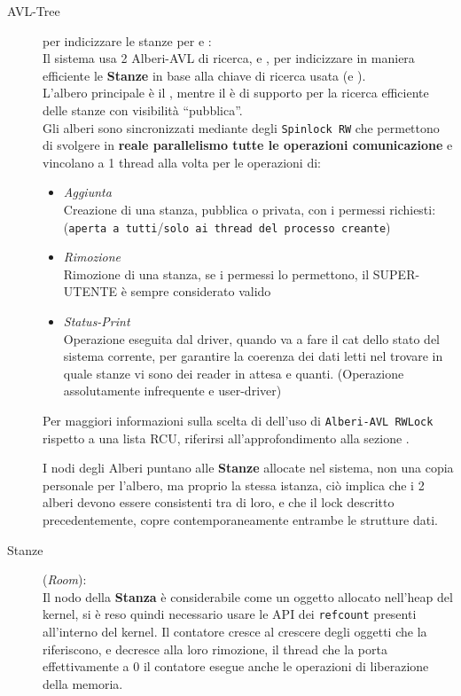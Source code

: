\begin{description}
\item[AVL-Tree] per indicizzare le stanze per \tagSys e \keySys:\\
    Il sistema usa 2 Alberi-AVL di ricerca, \tagTree e \keyTree, per indicizzare in maniera efficiente le
    \textbf{Stanze} in base alla chiave di ricerca usata (\tagSys e \keySys). \\
    L'albero principale è il \tagTree, mentre il \keyTree è di supporto per la ricerca efficiente delle
    stanze con visibilità ``pubblica''.\\
    Gli alberi sono sincronizzati mediante degli \texttt{Spinlock RW} che permettono di svolgere in \textbf{reale
    parallelismo tutte le operazioni comunicazione} e vincolano a 1 thread alla volta per le operazioni di:
    \begin{itemize}
    \item \textit{Aggiunta} \\
        Creazione di una stanza, pubblica o privata, con i permessi richiesti:\\
        (\texttt{aperta a tutti}/\texttt{solo ai thread del processo creante})
    \item \textit{Rimozione} \\
        Rimozione di una stanza, se i permessi lo permettono, il SUPER-UTENTE è sempre considerato valido
    \item \textit{Status-Print} \\
        Operazione eseguita dal driver, quando va a fare il cat dello stato del sistema corrente, per garantire la
        coerenza dei dati letti nel trovare in quale stanze vi sono dei reader in attesa e quanti. (Operazione
        assolutamente infrequente e user-driver)
\end{itemize}

\begin{footnotesize}
Per maggiori informazioni sulla scelta di dell'uso di \texttt{Alberi-AVL RWLock} rispetto a una lista
RCU, riferirsi all'approfondimento alla sezione .
\end{footnotesize}

I nodi degli Alberi puntano alle \textbf{Stanze} allocate nel sistema, non una copia personale per l'albero, ma
proprio la stessa istanza, ciò implica che i 2 alberi devono essere consistenti tra di loro, e che il lock
descritto precedentemente, copre contemporaneamente entrambe le strutture dati.

\item[Stanze] (\textit{Room}):\\
Il nodo della \textbf{Stanza} è considerabile come un oggetto allocato nell'heap del kernel, si è reso
quindi necessario usare le API dei \texttt{refcount} presenti all'interno del kernel. Il contatore cresce al
crescere degli oggetti che la riferiscono, e decresce alla loro rimozione, il thread che la porta
effettivamente a 0 il contatore esegue anche le operazioni di liberazione della memoria.


\end{description}

